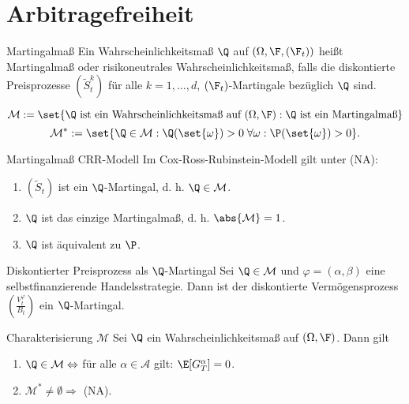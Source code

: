 \section{Arbitragefreiheit}

\begin{karte}{Martingalmaß}
Ein Wahrscheinlichkeitsmaß \(\Q\) auf \((\Omega, \F, (\F_t))\) 
heißt Martingalmaß oder risikoneutrales Wahrscheinlichkeitsmaß, 
falls die diskontierte Preisprozesse \((\tilde{S}_t^k)\) für alle 
\(k = 1,\ldots, d\), \((\F_t)\)-Martingale bezüglich \(\Q\) sind.

\[\mathcal{M} := \set{\Q \text{ ist ein Wahrscheinlichkeitsmaß auf \((\Omega, \F): \Q\) ist ein Martingalmaß}}\]
\[ \mathcal{M}^* := \set{\Q \in \mathcal{M}: \Q(\set{\omega}) > 0 \;\forall \omega: \P(\set{\omega}) > 0}. \]
\end{karte}

\begin{karte}{Martingalmaß CRR-Modell}
Im Cox-Ross-Rubinstein-Modell gilt unter (NA): 
\begin{enumerate}
    \item \((\tilde{S}_t)\) ist ein \(\Q\)-Martingal, d. h. \(\Q \in \mathcal{M}\).
    \item \(\Q\) ist das einzige Martingalmaß, d. h. \(\abs{\mathcal{M}} = 1\).
    \item \(\Q\) ist äquivalent zu \(\P\).
\end{enumerate}
\end{karte}

\begin{karte}{Diskontierter Preisprozess als \(\Q\)-Martingal}
Sei \(\Q \in \mathcal{M}\) und \(\varphi = (\alpha, \beta)\) eine 
selbstfinanzierende Handelsstrategie. Dann ist der diskontierte 
Vermögensprozess \(\left( \frac{V_t^\varphi}{B_t} \right)\) ein 
\(\Q\)-Martingal.
\end{karte}

\begin{karte}{Charakterisierung \(\mathcal{M}\)}
Sei \(\Q\) ein Wahrscheinlichkeitsmaß auf \((\Omega, \F)\). Dann gilt 
\begin{enumerate}
    \item \(\Q \in \mathcal{M} \Leftrightarrow\) für alle \(\alpha \in \mathcal{A}\) 
    gilt: \(\E[G_T^\alpha] = 0\).
    \item \(\mathcal{M}^* \neq \emptyset \Rightarrow\) (NA).
\end{enumerate}
\end{karte}

